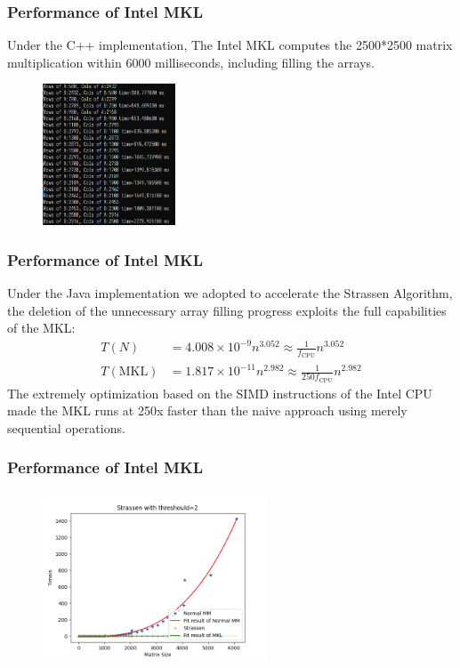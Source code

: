 \documentclass[cjk]{beamer}
\begin{document}
\begin{frame}
  \frametitle{Performance of Intel MKL}
  Under the C++ implementation, The Intel MKL computes the 2500*2500 matrix multiplication within 6000 milliseconds, including filling the arrays.
  \begin{figure}[htb]
    \begin{center}
      \includegraphics[height=4.2cm]{mkl_dgemm.png}
    \end{center}
  \end{figure}
\end{frame}
\begin{frame}
  \frametitle{Performance of Intel MKL}

  Under the Java implementation we adopted to accelerate the Strassen Algorithm, the deletion of the unnecessary array filling progress exploits the full capabilities of the MKL:
  \begin{equation}
    \begin{aligned}
      T(N)          & =4.008\times 10^{-9}n^{3.052}\approx \frac{1}{f_{\text{CPU}}}n^{3.052}     \\
      T(\text{MKL}) & =1.817\times 10^{-11}n^{2.982}\approx \frac{1}{250f_{\text{CPU}}}n^{2.982}
    \end{aligned}
  \end{equation}
  The extremely optimization based on the SIMD instructions of the Intel CPU made the MKL runs at 250x faster than the naive approach using merely sequential operations.
\end{frame}
\begin{frame}
  \frametitle{Performance of Intel MKL}

  \begin{figure}[htb]
    \begin{center}
      \includegraphics[height=5.0cm]{mkl.png}
    \end{center}
  \end{figure}

\end{frame}
\end{document}
